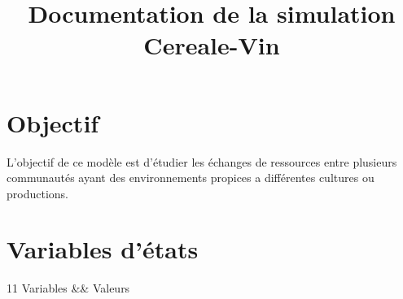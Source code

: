 \documentclass[a4paper,oneside,12 pt]{article}
\title{Documentation de la simulation Cereale-Vin }
\begin{document}
\maketitle



\clearpage 

\section{Objectif}
	L'objectif de ce modèle est d'étudier les échanges de ressources entre plusieurs communautés ayant des environnements propices a différentes cultures ou productions.

\section{Variables d'états}
\begin{tabular}{11}
Variables && Valeurs \\
\\

\end{tabular}
\end{document}
